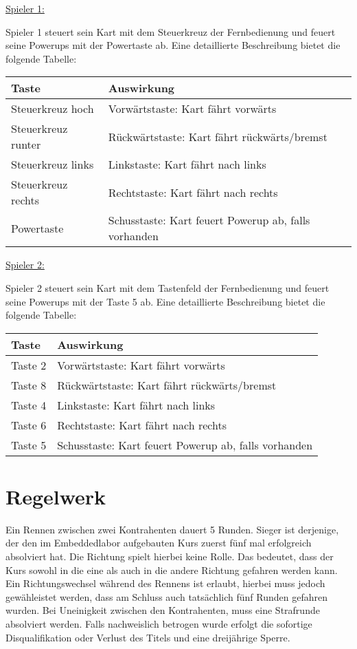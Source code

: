 \underline{Spieler 1:}

Spieler 1 steuert sein Kart mit dem Steuerkreuz der Fernbedienung und feuert seine Powerups mit der Powertaste ab. Eine detaillierte Beschreibung bietet die folgende Tabelle:

\vspace{0.5cm}
\begin{tabular}{|l|l|}
\hline
Taste & Auswirkung \\ \hline
Steuerkreuz hoch & Vorwärtstaste: Kart fährt vorwärts \\ \hline
Steuerkreuz runter & Rückwärtstaste: Kart fährt rückwärts/bremst \\ \hline
Steuerkreuz links & Linkstaste: Kart fährt nach links \\ \hline
Steuerkreuz rechts & Rechtstaste: Kart fährt nach rechts \\ \hline
Powertaste & Schusstaste: Kart feuert Powerup ab, falls vorhanden \\ \hline  
\end{tabular} 
\vspace{0.5cm}

\underline{Spieler 2:}
 
Spieler 2 steuert sein Kart mit dem Tastenfeld der Fernbedienung und feuert seine Powerups mit der Taste 5 ab. Eine detaillierte Beschreibung bietet die folgende Tabelle:

\vspace{0.5cm}
\begin{tabular}{|l|l|}
\hline
Taste & Auswirkung \\ \hline
Taste 2 & Vorwärtstaste: Kart fährt vorwärts \\ \hline
Taste 8 & Rückwärtstaste: Kart fährt rückwärts/bremst \\ \hline
Taste 4 & Linkstaste: Kart fährt nach links \\ \hline
Taste 6 & Rechtstaste: Kart fährt nach rechts \\ \hline
Taste 5 & Schusstaste: Kart feuert Powerup ab, falls vorhanden \\ \hline 
\end{tabular}
\vspace{0.5cm}

\section{Regelwerk}
Ein Rennen zwischen zwei Kontrahenten dauert 5 Runden. Sieger ist derjenige, der den im Embeddedlabor aufgebauten Kurs zuerst fünf mal erfolgreich absolviert hat. Die Richtung spielt hierbei keine Rolle. Das bedeutet, dass der Kurs sowohl in die eine als auch in die andere Richtung gefahren werden kann. Ein Richtungswechsel während des Rennens ist erlaubt, hierbei muss jedoch gewähleistet werden, dass am Schluss auch tatsächlich fünf Runden gefahren wurden. Bei Uneinigkeit zwischen den Kontrahenten, muss eine Strafrunde absolviert werden. Falls nachweislich betrogen wurde erfolgt die sofortige Disqualifikation oder Verlust des Titels und eine dreijährige Sperre. 

